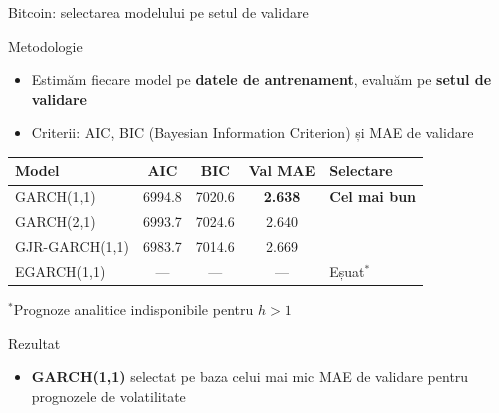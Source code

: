\documentclass[9pt, aspectratio=169, t]{beamer}
\begin{document}
\begin{frame}{Bitcoin: selectarea modelului pe setul de validare}
    \vspace{-0.2cm}
    {\scriptsize
    \begin{block}{Metodologie}
        \begin{itemize}\setlength{\itemsep}{0pt}
            \item Estimăm fiecare model pe \textbf{datele de antrenament}, evaluăm pe \textbf{setul de validare}
            \item Criterii: AIC, BIC (Bayesian Information Criterion) și MAE de validare
        \end{itemize}
    \end{block}

    \vspace{0.0cm}

    \begin{center}
    \begin{tabular}{lcccl}
        \toprule
        \textbf{Model} & \textbf{AIC} & \textbf{BIC} & \textbf{Val MAE} & \textbf{Selectare} \\
        \midrule
        GARCH(1,1) & 6994.8 & 7020.6 & \textbf{2.638} & \cellcolor{Forest!20}\textbf{Cel mai bun} \\
        GARCH(2,1) & 6993.7 & 7024.6 & 2.640 & \\
        GJR-GARCH(1,1) & 6983.7 & 7014.6 & 2.669 & \\
        EGARCH(1,1) & --- & --- & --- & Eșuat$^*$ \\
        \bottomrule
    \end{tabular}
    \end{center}
    {\footnotesize $^*$Prognoze analitice indisponibile pentru $h > 1$}

    \vspace{0.05cm}

    \begin{exampleblock}{Rezultat}
        \begin{itemize}\setlength{\itemsep}{0pt}
            \item \textbf{GARCH(1,1)} selectat pe baza celui mai mic MAE de validare pentru prognozele de volatilitate
        \end{itemize}
    \end{exampleblock}
    }
\end{frame}
\end{document}
